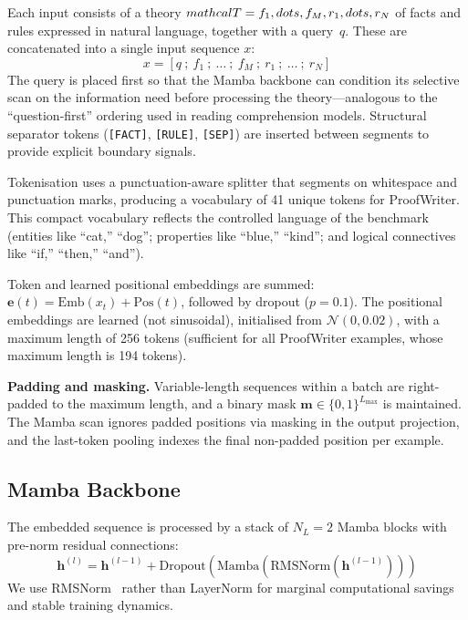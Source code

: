 \documentclass[conference]{IEEEtran}
\begin{document}
Each input consists of a theory $\\mathcal{T} = \\{f_1, \\dots, f_M,
r_1, \\dots, r_N\\}$ of facts and rules expressed in natural
language, together with a query~$q$.  These are concatenated into
a single input sequence $x$:
\begin{equation}
    x = [q\ ;\ f_1\ ;\ \dots\ ;\ f_M\ ;\ r_1\ ;\ \dots\ ;\ r_N]
\end{equation}
The query is placed first so that the Mamba backbone can condition
its selective scan on the information need before processing the
theory---analogous to the ``question-first'' ordering used in
reading comprehension models.  Structural separator tokens
(\texttt{[FACT]}, \texttt{[RULE]}, \texttt{[SEP]}) are inserted
between segments to provide explicit boundary signals.

Tokenisation uses a punctuation-aware splitter that segments on
whitespace and punctuation marks, producing a vocabulary of 41
unique tokens for ProofWriter.  This compact vocabulary reflects
the controlled language of the benchmark (entities like ``cat,''
``dog''; properties like ``blue,'' ``kind''; and logical
connectives like ``if,'' ``then,'' ``and'').

Token and learned positional embeddings are summed:
$\mathbf{e}(t) = \mathrm{Emb}(x_t) + \mathrm{Pos}(t)$,
followed by dropout ($p = 0.1$).  The positional embeddings are
learned (not sinusoidal), initialised from $\mathcal{N}(0, 0.02)$,
with a maximum length of 256 tokens (sufficient for all
ProofWriter examples, whose maximum length is 194 tokens).

\textbf{Padding and masking.}  Variable-length sequences within
a batch are right-padded to the maximum length, and a binary
mask $\mathbf{m} \in \{0,1\}^{L_{\max}}$ is maintained.  The
Mamba scan ignores padded positions via masking in the output
projection, and the last-token pooling indexes the final
non-padded position per example.

\subsection{Mamba Backbone}
\label{sec:backbone}

The embedded sequence is processed by a stack of $N_L = 2$ Mamba
blocks with pre-norm residual connections:
\begin{equation}
    \mathbf{h}^{(l)} = \mathbf{h}^{(l-1)} +
    \mathrm{Dropout}\!\left(\mathrm{Mamba}\!\left(
    \mathrm{RMSNorm}(\mathbf{h}^{(l-1)})\right)\right)
\end{equation}
We use RMSNorm~\cite{zhang2019rms} rather than LayerNorm for
marginal computational savings and stable training dynamics.
\end{document}
